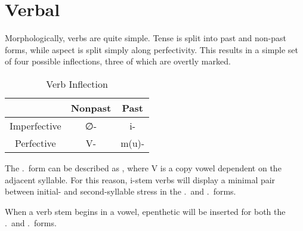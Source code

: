 \chapter{Verbal}

Morphologically, verbs are quite simple. Tense is split into past and non-past forms, while aspect is split simply along perfectivity. This results in a simple set of four possible inflections, three of which are overtly marked.

\begin{table}[ht]
  \centering
  \begin{tabular}{*{3}{c}}
    \toprule
                 & Nonpast & Past  \\\midrule
    Imperfective & ∅-      & i-    \\
    Perfective   & V-      & m(u)- \\
    \bottomrule
  \end{tabular}
  \caption{Verb Inflection}
  \label{table:verb-inflection}
\end{table}

The \NPST.\PFV\ form can be described as , where V is a copy vowel dependent on the adjacent syllable. For this reason, i-stem verbs will display a minimal pair between initial- and second-syllable stress in the \NPST.\PFV\ and \PST.\IPFV\ forms.

When a verb stem begins in a vowel, epenthetic  will be inserted for both the \NPST.\PFV\ and \PST.\IPFV\ forms.
